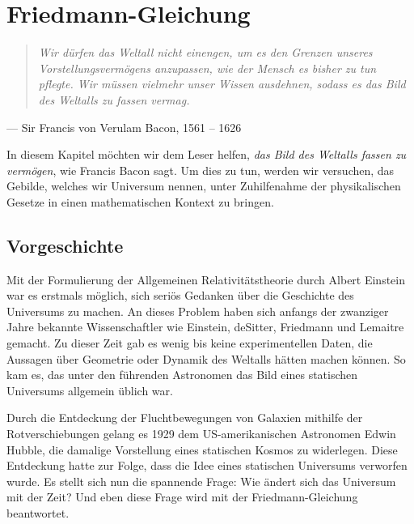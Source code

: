 \chapter{Friedmann-Gleichung\label{chapter:friedmann}}
\begin{refsection}
\rhead{}
\begin{quote}\it
Wir dürfen das Weltall nicht einengen, um es den Grenzen unseres
Vorstellungsvermögens anzupassen, wie der Mensch es bisher zu tun pflegte.
Wir müssen vielmehr unser Wissen ausdehnen, sodass es das Bild des Weltalls
zu fassen vermag.
\end{quote}
\begin{flushright}
--- Sir Francis von Verulam Bacon, 1561 -- 1626
\end{flushright}

In diesem Kapitel möchten wir dem Leser helfen,
{\em das Bild des Weltalls fassen zu vermögen}, wie Francis Bacon sagt.
Um dies zu tun, werden wir versuchen, das Gebilde, welches wir Universum nennen, unter Zuhilfenahme der physikalischen Gesetze in einen mathematischen Kontext zu bringen.

\section{Vorgeschichte}
Mit der Formulierung der Allgemeinen Relativitätstheorie durch Albert Einstein war es erstmals möglich,
sich seriös Gedanken über die Geschichte des
Universums zu machen. An dieses Problem haben sich anfangs der zwanziger Jahre bekannte Wissenschaftler wie Einstein, deSitter, Friedmann und Lemaitre gemacht. 
Zu dieser Zeit gab es wenig bis keine experimentellen Daten, die Aussagen über Geometrie oder Dynamik des Weltalls hätten machen können. So kam es, das unter den führenden Astronomen das Bild eines statischen Universums allgemein üblich war.

Durch die Entdeckung der Fluchtbewegungen von Galaxien mithilfe der Rotverschiebungen gelang es 1929 dem US-amerikanischen Astronomen Edwin Hubble, die damalige Vorstellung eines statischen Kosmos zu widerlegen. Diese Entdeckung hatte zur Folge, dass die Idee eines statischen Universums verworfen wurde. Es stellt sich nun die spannende Frage: Wie ändert sich das Universum mit der Zeit? Und eben diese Frage wird mit der Friedmann-Gleichung beantwortet.
\pagebreak


\end{refsection}
